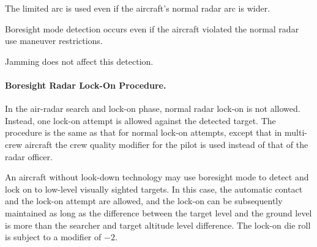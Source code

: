 \begin{advancedrules}
{The limited arc is used even if the aircraft's normal radar arc is wider.

Boresight mode detection occurs even if the aircraft violated the normal radar use maneuver restrictions.

Jamming does not affect this detection. 

\paragraph{Boresight Radar Lock-On Procedure.}

In the air-radar search and lock-on phase, normal radar lock-on is not allowed.
Instead, one lock-on attempt is allowed against the detected target. The procedure is the same as that for normal lock-on attempts, except that in  multi-crew aircraft the crew quality modifier for the pilot is used instead of that of the radar officer.


An aircraft without look-down technology may use boresight mode to detect and lock on to low-level visually sighted targets. In this case, the automatic contact and the lock-on attempt are allowed, and the lock-on can be subsequently maintained as long as the difference between the target level and the ground level is more than the searcher and target altitude level difference. The lock-on die roll is subject to a modifier of $-2$. }

\end{advancedrules}
